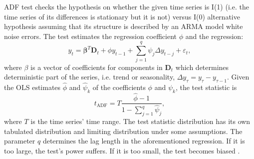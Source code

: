 \documentclass[12pt, bachelor, substylefile = algo_title.rtx]{disser}
\newcommand{\eps}{\varepsilon}
\theoremstyle{definition}
\begin{document}
ADF test checks the hypothesis on whether the given time series is I(1) (i.e. the time series of its differences is stationary but it is not) versus I(0) alternative hypothesis assuming that its structure is described by an ARMA model white noise errors. The test estimates the regression coefficient $\phi$ and the regression:
\[ y_t = \mathbf{\beta}^T \mathbf{D}_t + \phi y_{t-1}  + \sum_{j=1}^{q} \psi_j \Delta y_{t-j} + \eps_t, \]
where $\beta$ is a vector of coefficients for components in $\mathbf{D}_t$ which determines deterministic part of the series, i.e. trend or seasonality, $\Delta y_\tau = y_{\tau} - y_{\tau-1}$. Given the OLS estimates $\widehat{\phi}$ and $\widehat{\psi}_k$ of the coefficients $\phi$ and $\psi_k$, the test statistic is
\[ t_{\text{ADF}} = T\frac{\widehat{\phi}-1}{1 - \sum_{j=1}^{q} \widehat{\psi}_j}, \]
where $T$ is the time series' time range. The test statistic distribution has its own tabulated distribution and limiting distribution under some assumptions. The parameter $q$ determines the lag length in the aforementioned regression. If it is too large, the test's power suffers. If it is too small, the test becomes biased \cite{Zivot01}.
\end{document}
